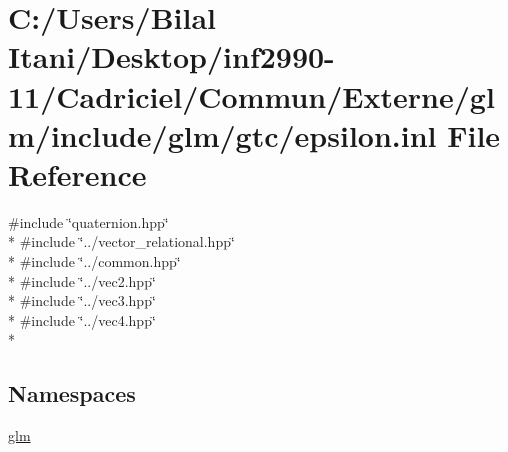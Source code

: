 \hypertarget{epsilon_8inl}{}\section{C\+:/\+Users/\+Bilal Itani/\+Desktop/inf2990-\/11/\+Cadriciel/\+Commun/\+Externe/glm/include/glm/gtc/epsilon.inl File Reference}
\label{epsilon_8inl}
{\ttfamily \#include \char`\"{}quaternion.\+hpp\char`\"{}}\\*
{\ttfamily \#include \char`\"{}../vector\+\_\+relational.\+hpp\char`\"{}}\\*
{\ttfamily \#include \char`\"{}../common.\+hpp\char`\"{}}\\*
{\ttfamily \#include \char`\"{}../vec2.\+hpp\char`\"{}}\\*
{\ttfamily \#include \char`\"{}../vec3.\+hpp\char`\"{}}\\*
{\ttfamily \#include \char`\"{}../vec4.\+hpp\char`\"{}}\\*
\subsection*{Namespaces}
\begin{DoxyCompactItemize}
\item 
 \hyperlink{namespaceglm}{glm}
\end{DoxyCompactItemize}
